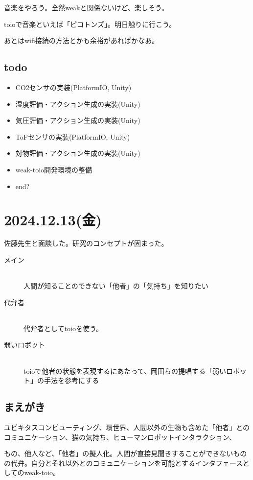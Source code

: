 \documentclass[fleqn,twocolumn]{mynote}
\begin{document}
音楽をやろう。全然weakと関係ないけど、楽しそう。

toioで音楽といえば「ピコトンズ」。明日触りに行こう。

あとはwifi接続の方法とかも余裕があればかなあ。

\subsection*{todo}
\begin{itemize}
  \item CO2センサの実装(PlatformIO, Unity)
  \item 湿度評価・アクション生成の実装(Unity)
  \item 気圧評価・アクション生成の実装(Unity)
  \item ToFセンサの実装(PlatformIO, Unity)
  \item 対物評価・アクション生成の実装(Unity)
  \item weak-toio開発環境の整備
  \item end?
\end{itemize}

\section*{2024.12.13(金)}
佐藤先生と面談した。研究のコンセプトが固まった。

\begin{description}
  \item[メイン]\mbox{}\\
    人間が知ることのできない「他者」の「気持ち」を知りたい
  \item[代弁者]\mbox{}\\
    代弁者としてtoioを使う。
  \item[弱いロボット]\mbox{}\\
    toioで他者の状態を表現するにあたって、岡田らの提唱する「弱いロボット」の手法を参考にする
\end{description}

\subsection*{まえがき}
ユビキタスコンピューティング、環世界、人間以外の生物も含めた「他者」とのコミュニケーション、猫の気持ち、ヒューマンロボットインタラクション、

もの、他人など、「他者」の擬人化。人間が直接見聞きすることができないものの代弁。自分とそれ以外とのコミュニケーションを可能とするインタフェースとしてのweak-toio。
\end{document}
